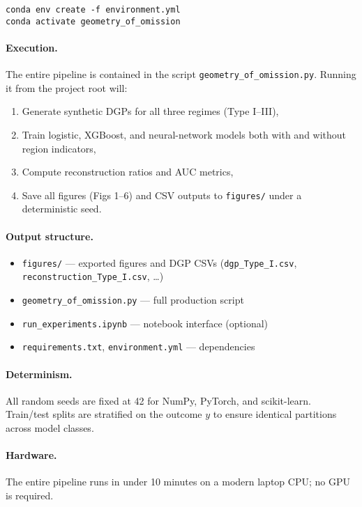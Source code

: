\documentclass[11pt]{article}
\begin{document}
\begin{verbatim}
conda env create -f environment.yml
conda activate geometry_of_omission
\end{verbatim}

\paragraph{Execution.}
The entire pipeline is contained in the script
\texttt{geometry\_of\_omission.py}.
Running it from the project root will:

\begin{enumerate}[noitemsep,topsep=0pt]
  \item Generate synthetic DGPs for all three regimes (Type I–III),
  \item Train logistic, XGBoost, and neural-network models
        both with and without region indicators,
  \item Compute reconstruction ratios and AUC metrics,
  \item Save all figures (Figs 1–6) and CSV outputs
        to \texttt{figures/} under a deterministic seed.
\end{enumerate}

\paragraph{Output structure.}
\begin{itemize}[noitemsep,topsep=0pt]
  \item \texttt{figures/} — exported figures and DGP CSVs  
        (\texttt{dgp\_Type\_I.csv}, \texttt{reconstruction\_Type\_I.csv}, …)
  \item \texttt{geometry\_of\_omission.py} — full production script  
  \item \texttt{run\_experiments.ipynb} — notebook interface (optional)  
  \item \texttt{requirements.txt}, \texttt{environment.yml} — dependencies
\end{itemize}

\paragraph{Determinism.}
All random seeds are fixed at 42
for NumPy, PyTorch, and scikit-learn.
Train/test splits are stratified on the outcome $y$
to ensure identical partitions across model classes.

\paragraph{Hardware.}
The entire pipeline runs in under 10 minutes
on a modern laptop CPU; no GPU is required.
\end{document}
